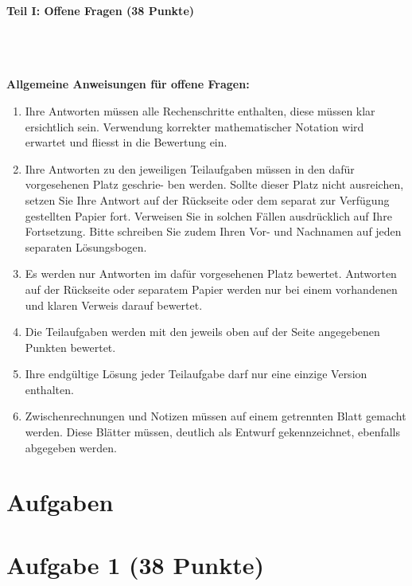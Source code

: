 

\begin{Large}
\textbf{Teil I: Offene Fragen (38 Punkte)}
\end{Large}
\\
\\
\\
\textbf{Allgemeine Anweisungen für offene Fragen:}
\\
\renewcommand{\labelenumi}{(\roman{enumi})}
\begin{enumerate}
\item
Ihre Antworten müssen alle Rechenschritte enthalten,
diese müssen klar ersichtlich sein.
Verwendung korrekter mathematischer Notation wird erwartet
und fliesst in die Bewertung ein.

\item
Ihre Antworten zu den jeweiligen Teilaufgaben müssen in den dafür vorgesehenen Platz geschrie-
ben werden. Sollte dieser Platz nicht ausreichen, setzen Sie Ihre Antwort auf der Rückseite oder
dem separat zur Verfügung gestellten Papier fort. Verweisen Sie in solchen Fällen ausdrücklich
auf Ihre Fortsetzung. Bitte schreiben Sie zudem Ihren Vor- und Nachnamen auf jeden separaten
Lösungsbogen.

\item
Es werden nur Antworten im dafür vorgesehenen Platz bewertet. Antworten auf der Rückseite
oder separatem Papier werden nur bei einem vorhandenen und klaren Verweis darauf bewertet.

\item
Die Teilaufgaben werden mit den jeweils oben auf der Seite angegebenen Punkten bewertet.

\item
Ihre endgültige Lösung jeder Teilaufgabe darf nur eine einzige Version enthalten.

\item
Zwischenrechnungen und Notizen müssen auf einem getrennten Blatt gemacht werden. Diese
Blätter müssen, deutlich als Entwurf gekennzeichnet, ebenfalls abgegeben werden.
\end{enumerate}

\newpage
\section*{\hfil Aufgaben \hfil}
\vspace{1cm}
\section*{Aufgabe 1 (38 Punkte)}
\vspace{0.4cm}
